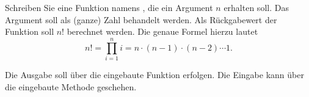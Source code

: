 %
\par Schreiben Sie eine Funktion namens , die ein Argument $n$
erhalten soll. Das Argument soll als (ganze) Zahl behandelt werden. Als
Rückgabewert der Funktion soll $n!$ berechnet werden. Die genaue Formel hierzu
lautet
%
\begin{equation}
n! = \prod_{i = 1}^n i = n \cdot (n - 1) \cdot (n - 2) \cdots 1.
\end{equation}
%
\par Die Ausgabe soll über die eingebaute Funktion  erfolgen. Die
Eingabe kann über die eingebaute Methode  geschehen.